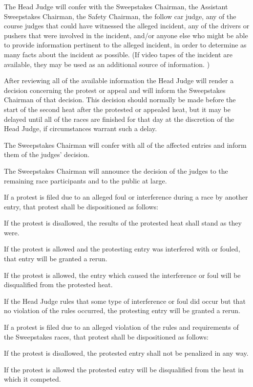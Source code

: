 \documentclass[openany]{book}
\begin{document}
The Head Judge will confer with the Sweepstakes Chairman, the Assistant Sweepstakes Chairman, the Safety Chairman, the follow car judge, any of the course judges that could have witnessed the alleged incident, any of the drivers or pushers that were involved in the incident, and/or anyone else who might be able to provide information pertinent to the alleged incident, in order to determine as many facts about the incident as possible. (If video tapes of the incident are available, they may be used as an additional source of information. )

After reviewing all of the available information the Head Judge will render a decision concerning the protest or appeal and will inform the Sweepstakes Chairman of that decision. This decision should normally be made before the start of the second heat after the protested or appealed heat, but it may be delayed until all of the races are finished for that day at the discretion of the Head Judge, if circumstances warrant such a delay.

The Sweepstakes Chairman will confer with all of the affected entries and inform them of the judges' decision.

The Sweepstakes Chairman will announce the decision of the judges to the remaining race participants and to the public at large.

If a protest is filed due to an alleged foul or interference during a race by another entry, that protest shall be dispositioned as follows:

If the protest is disallowed, the results of the protested heat shall stand as they were.

If the protest is allowed and the protesting entry was interfered with or fouled, that entry will be granted a rerun.

If the protest is allowed, the entry which caused the interference or foul will be disqualified from the protested heat.

If the Head Judge rules that some type of interference or foul did occur but that no violation of the rules occurred, the protesting entry will be granted a rerun.

If a protest is filed due to an alleged violation of the rules and requirements of the Sweepstakes races, that protest shall be dispositioned as follows:

If the protest is disallowed, the protested entry shall not be penalized in any way.

If the protest is allowed the protested entry will be disqualified from the heat in which it competed.
\end{document}
